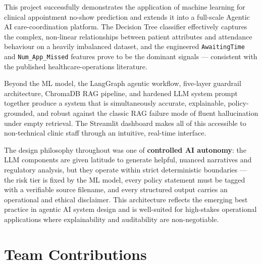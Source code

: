 \documentclass[11pt,a4paper]{article}
\begin{document}
This project successfully demonstrates the application of machine learning
for clinical appointment no-show prediction and extends it into a
full-scale Agentic AI care-coordination platform. The Decision Tree
classifier effectively captures the complex, non-linear relationships
between patient attributes and attendance behaviour on a heavily
imbalanced dataset, and the engineered \texttt{AwaitingTime} and
\texttt{Num\_App\_Missed} features prove to be the dominant signals ---
consistent with the published healthcare-operations literature.

Beyond the ML model, the LangGraph agentic workflow, five-layer guardrail
architecture, ChromaDB RAG pipeline, and hardened LLM system prompt
together produce a system that is simultaneously accurate, explainable,
policy-grounded, and robust against the classic RAG failure mode of
fluent hallucination under empty retrieval. The Streamlit dashboard makes
all of this accessible to non-technical clinic staff through an
intuitive, real-time interface.

The design philosophy throughout was one of \textbf{controlled AI
autonomy}: the LLM components are given latitude to generate helpful,
nuanced narratives and regulatory analysis, but they operate within
strict deterministic boundaries --- the risk tier is fixed by the ML
model, every policy statement must be tagged with a verifiable source
filename, and every structured output carries an operational and ethical
disclaimer. This architecture reflects the emerging best practice in
agentic AI system design and is well-suited for high-stakes operational
applications where explainability and auditability are non-negotiable.

\section{Team Contributions}
\end{document}

